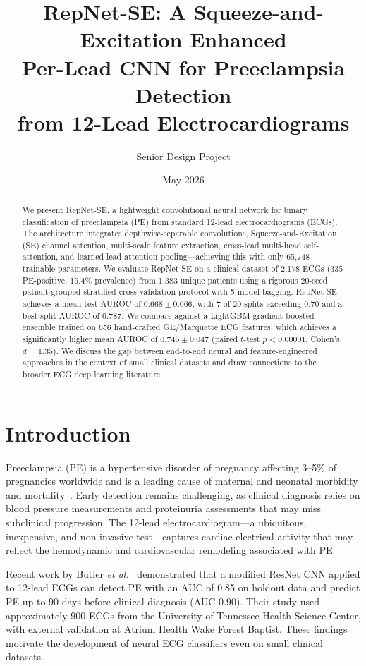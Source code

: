 \documentclass[11pt,a4paper]{article}
\title{%
  \textbf{RepNet-SE: A Squeeze-and-Excitation Enhanced\\
  Per-Lead CNN for Preeclampsia Detection\\
  from 12-Lead Electrocardiograms}
}
\author{Senior Design Project}
\date{May 2026}
\newcommand{\etal}{\textit{et al.}}
\begin{document}
\maketitle

\begin{abstract}
We present RepNet-SE, a lightweight convolutional neural network for binary classification of preeclampsia (PE) from standard 12-lead electrocardiograms (ECGs). The architecture integrates depthwise-separable convolutions, Squeeze-and-Excitation (SE) channel attention, multi-scale feature extraction, cross-lead multi-head self-attention, and learned lead-attention pooling---achieving this with only 65,748 trainable parameters. We evaluate RepNet-SE on a clinical dataset of 2,178 ECGs (335 PE-positive, 15.4\% prevalence) from 1,383 unique patients using a rigorous 20-seed patient-grouped stratified cross-validation protocol with 5-model bagging. RepNet-SE achieves a mean test AUROC of $0.668 \pm 0.066$, with 7 of 20 splits exceeding 0.70 and a best-split AUROC of 0.787. We compare against a LightGBM gradient-boosted ensemble trained on 656 hand-crafted GE/Marquette ECG features, which achieves a significantly higher mean AUROC of $0.745 \pm 0.047$ (paired $t$-test $p < 0.00001$, Cohen's $d = 1.35$). We discuss the gap between end-to-end neural and feature-engineered approaches in the context of small clinical datasets and draw connections to the broader ECG deep learning literature.
\end{abstract}

\section{Introduction}
\label{sec:intro}

Preeclampsia (PE) is a hypertensive disorder of pregnancy affecting 3--5\% of pregnancies worldwide and is a leading cause of maternal and neonatal morbidity and mortality~\cite{steegers2010}. Early detection remains challenging, as clinical diagnosis relies on blood pressure measurements and proteinuria assessments that may miss subclinical progression. The 12-lead electrocardiogram---a ubiquitous, inexpensive, and non-invasive test---captures cardiac electrical activity that may reflect the hemodynamic and cardiovascular remodeling associated with PE.

Recent work by Butler \etal~\cite{butler2024} demonstrated that a modified ResNet CNN applied to 12-lead ECGs can detect PE with an AUC of 0.85 on holdout data and predict PE up to 90 days before clinical diagnosis (AUC 0.90). Their study used approximately 900 ECGs from the University of Tennessee Health Science Center, with external validation at Atrium Health Wake Forest Baptist. These findings motivate the development of neural ECG classifiers even on small clinical datasets.
\end{document}
